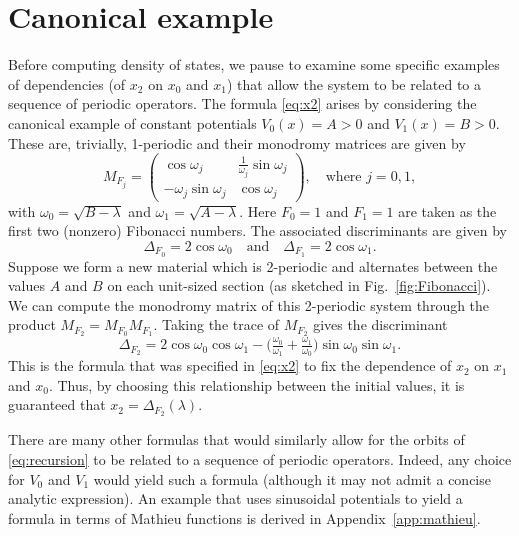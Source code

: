 \documentclass[nofootinbib,prb,amsmath,amssymb,twocolumn,floatfix]{revtex4-2}
\theoremstyle{definition}
\begin{document}
\section{Canonical example} \label{sec:constants}

Before computing density of states, we pause to examine some specific examples of dependencies (of $x_2$ on $x_0$ and $x_1$) that allow the system to be related to a sequence of periodic operators. The formula \eqref{eq:x2} arises by considering the canonical example of constant potentials $V_0(x)=A>0$ and $V_1(x)=B>0$. These are, trivially, 1-periodic and their monodromy matrices are given by
\begin{equation}
	M_{F_j}=\begin{pmatrix} \cos\omega_j & \frac{1}{\omega_j}\sin\omega_j \\ -\omega_j\sin\omega_j & \cos\omega_j \end{pmatrix}, \quad \text{where } j=0,1,
\end{equation}
with $\omega_0=\sqrt{B-\lambda}$ and $\omega_1=\sqrt{A-\lambda}$. Here $F_0=1$ and $F_1=1$ are taken as the first two (nonzero) Fibonacci numbers. The associated discriminants are given by
\begin{equation}
	\Delta_{F_0}=2\cos\omega_0
	\quad\text{and}\quad
	\Delta_{F_1}=2\cos\omega_1.
\end{equation}
Suppose we form a new material which is 2-periodic and alternates between the values $A$ and $B$ on each unit-sized section (as sketched in Fig.~\ref{fig:Fibonacci}). We can compute the monodromy matrix of this 2-periodic system through the product $M_{F_2}=M_{F_0}M_{F_1}$. Taking the trace of $M_{F_2}$ gives the discriminant
\begin{equation}
	\Delta_{F_2} = 2\cos\omega_0\cos\omega_1-\big( \tfrac{\omega_0}{\omega_1} + \tfrac{\omega_1}{\omega_0} \big) \sin\omega_0\sin\omega_1.
\end{equation}
This is the formula that was specified in \eqref{eq:x2} to fix the dependence of $x_2$ on $x_1$ and $x_0$. Thus, by choosing this relationship between the initial values, it is guaranteed that $x_2=\Delta_{F_2}(\lambda)$.

There are many other formulas that would similarly allow for the orbits of \eqref{eq:recursion} to be related to a sequence of periodic operators. Indeed, any choice for $V_0$ and $V_1$ would yield such a formula (although it may not admit a concise analytic expression). An example that uses sinusoidal potentials to yield a formula in terms of Mathieu functions is derived in Appendix~\ref{app:mathieu}.
\end{document}
